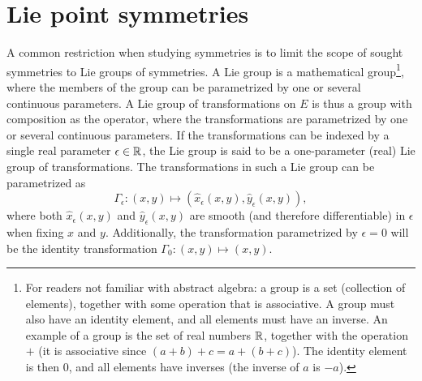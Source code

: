 \section{Lie point symmetries}

A common restriction when studying symmetries is to limit the scope of sought symmetries to Lie groups of symmetries.
A Lie group is a mathematical group\footnote{For readers not familiar with abstract algebra: a group is a set (collection of elements), together with some operation that is associative. A group must also have an identity element, and all elements must have an inverse. An example of a group is the set of real numbers \(\mathbb{R}\), together with the operation \(+\) (it is associative since \((a + b) + c = a + (b + c)\)). The identity element is then \(0\), and all elements have inverses (the inverse of \(a\) is \(-a\)).}, where the members of the group can be parametrized by one or several continuous parameters.
A Lie group of transformations on \(E\) is thus a group with composition as the operator, where the transformations are parametrized by one or several continuous parameters.
If the transformations can be indexed by a single real parameter \(\epsilon \in \mathbb{R}\), the Lie group is said to be a one-parameter (real) Lie group of transformations.
The transformations in such a Lie group can be parametrized as
\begin{equation*} %
  \Gamma_\epsilon: \left(x,y\right) \mapsto \left(\hat{x}_\epsilon(x,y), \hat{y}_\epsilon(x,y)\right),
\end{equation*}
where both \(\hat{x}_\epsilon(x,y)\) and \(\hat{y}_\epsilon(x,y)\) are smooth (and therefore differentiable) in \(\epsilon\) when fixing \(x\) and \(y\).
Additionally, the transformation parametrized by \(\epsilon = 0\) will be the identity transformation \(\Gamma_0: \left(x,y\right) \mapsto \left(x,y\right)\).

